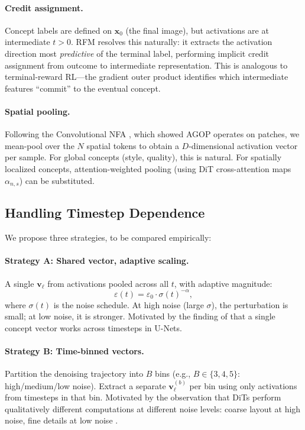 \documentclass[11pt]{article}
\newcommand{\bx}{\mathbf{x}}
\newcommand{\bv}{\mathbf{v}}
\begin{document}
\paragraph{Credit assignment.}
Concept labels are defined on $\bx_0$ (the final image), but activations are at intermediate $t > 0$.
RFM resolves this naturally: it extracts the activation direction most \emph{predictive} of the terminal label, performing implicit credit assignment from outcome to intermediate representation.
This is analogous to terminal-reward RL---the gradient outer product identifies which intermediate features ``commit'' to the eventual concept.

\paragraph{Spatial pooling.}
Following the Convolutional NFA \citep{beaglehole2023cnn}, which showed AGOP operates on patches, we mean-pool over the $N$ spatial tokens to obtain a $D$-dimensional activation vector per sample.
For global concepts (style, quality), this is natural.
For spatially localized concepts, attention-weighted pooling (using DiT cross-attention maps $\alpha_{n,s}$) can be substituted.

\subsection{Handling Timestep Dependence}
\label{sec:timestep}

We propose three strategies, to be compared empirically:

\paragraph{Strategy A: Shared vector, adaptive scaling.}
A single $\bv_\ell$ from activations pooled across all $t$, with adaptive magnitude:
\begin{equation}
    \varepsilon(t) = \varepsilon_0 \cdot \sigma(t)^{-\alpha},
    \label{eq:adaptive_eps}
\end{equation}
where $\sigma(t)$ is the noise schedule.
At high noise (large $\sigma$), the perturbation is small; at low noise, it is stronger.
Motivated by the finding of \citet{li2024selfdiscovering} that a single concept vector works across timesteps in U-Nets.

\paragraph{Strategy B: Time-binned vectors.}
Partition the denoising trajectory into $B$ bins (e.g., $B \in \{3, 4, 5\}$: high/medium/low noise).
Extract a separate $\bv_\ell^{(b)}$ per bin using only activations from timesteps in that bin.
Motivated by the observation that DiTs perform qualitatively different computations at different noise levels: coarse layout at high noise, fine details at low noise \citep{kwon2023diffusion,conceptattention2025}.
\end{document}
